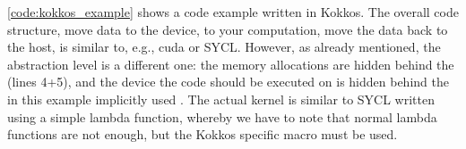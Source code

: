 \autoref{code:kokkos_example} shows a code example written in Kokkos. 
The overall code structure, move data to the device, to your computation, move the data back to the host, is similar to, e.g., \gls{cuda} or SYCL. 
However, as already mentioned, the abstraction level is a different one: the memory allocations are hidden behind the  (lines 4+5), and the device the code should be executed on is hidden behind the in this example implicitly used . 
The actual kernel is similar to SYCL written using a simple lambda function, whereby we have to note that normal \cpp lambda functions are not enough, but the Kokkos specific  macro must be used. 

